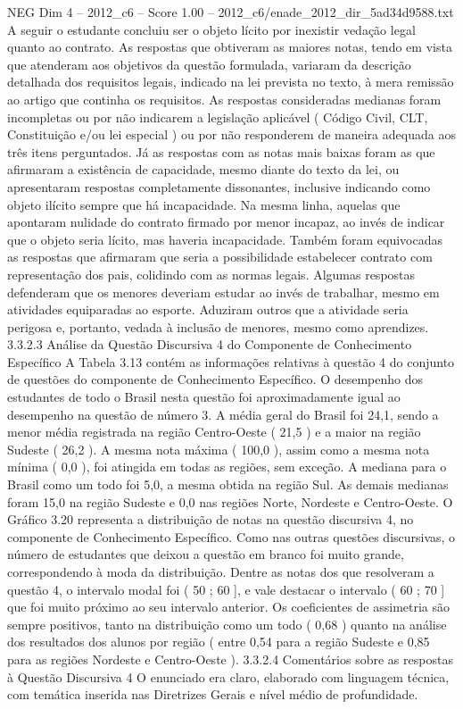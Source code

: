 \begin{textsample}{NEG Dim 4 – 2012\_c6 – Score 1.00 – 2012\_c6/enade\_2012\_dir\_5ad34d9588.txt}
A seguir o estudante concluiu ser o objeto lícito por inexistir vedação legal quanto ao contrato.
As respostas que obtiveram as maiores notas, tendo em vista que atenderam aos objetivos da questão formulada, variaram da descrição detalhada dos requisitos legais, indicado na lei prevista no texto, à mera remissão ao artigo que continha os requisitos.
As respostas consideradas medianas foram incompletas ou por não indicarem a legislação aplicável ( Código Civil, CLT, Constituição e/ou lei especial ) ou por não responderem de maneira adequada aos três itens perguntados.
Já as respostas com as notas mais baixas foram as que afirmaram a existência de capacidade, mesmo diante do texto da lei, ou apresentaram respostas completamente dissonantes, inclusive indicando como objeto ilícito sempre que há incapacidade.
Na mesma linha, aquelas que apontaram nulidade do contrato firmado por menor incapaz, ao invés de indicar que o objeto seria lícito, mas haveria incapacidade.
Também foram equivocadas as respostas que afirmaram que seria a possibilidade estabelecer contrato com representação dos pais, colidindo com as normas legais.
Algumas respostas defenderam que os menores deveriam estudar ao invés de trabalhar, mesmo em atividades equiparadas ao esporte.
Aduziram outros que a atividade seria perigosa e, portanto, vedada à inclusão de menores, mesmo como aprendizes. 3.3.2.3 Análise da Questão Discursiva 4 do Componente de Conhecimento Específico A Tabela 3.13 contém as informações relativas à questão 4 do conjunto de questões do componente de Conhecimento Específico.
O desempenho dos estudantes de todo o Brasil nesta questão foi aproximadamente igual ao desempenho na questão de número 3.
A média geral do Brasil foi 24,1, sendo a menor média registrada na região Centro-Oeste ( 21,5 ) e a maior na região Sudeste ( 26,2 ).
A mesma nota máxima ( 100,0 ), assim como a mesma nota mínima ( 0,0 ), foi atingida em todas as regiões, sem exceção.
A mediana para o Brasil como um todo foi 5,0, a mesma obtida na região Sul.
As demais medianas foram 15,0 na região Sudeste e 0,0 nas regiões Norte, Nordeste e Centro-Oeste.
O Gráfico 3.20 representa a distribuição de notas na questão discursiva 4, no componente de Conhecimento Específico.
Como nas outras questões discursivas, o número de estudantes que deixou a questão em branco foi muito grande, correspondendo à moda da distribuição.
Dentre as notas dos que resolveram a questão 4, o intervalo modal foi ( 50 ; 60 ], e vale destacar o intervalo ( 60 ; 70 ] que foi muito próximo ao seu intervalo anterior.
Os coeficientes de assimetria são sempre positivos, tanto na distribuição como um todo ( 0,68 ) quanto na análise dos resultados dos alunos por região ( entre 0,54 para a região Sudeste e 0,85 para as regiões Nordeste e Centro-Oeste ). 3.3.2.4 Comentários sobre as respostas à Questão Discursiva 4 O enunciado era claro, elaborado com linguagem técnica, com temática inserida nas Diretrizes Gerais e nível médio de profundidade.

\end{textsample}
